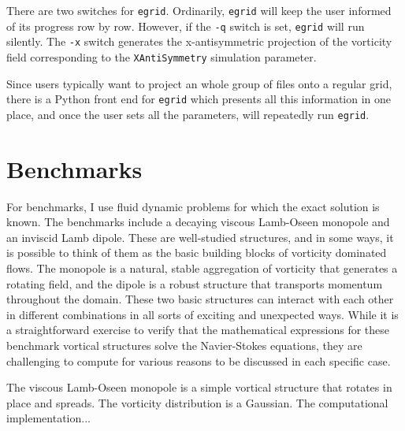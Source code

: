 \documentclass[12pt]{report}
\begin{document}
There are two switches for {\tt egrid}.  Ordinarily, {\tt egrid}
will keep the user informed of its progress row by row.  However, if the
{\tt -q} switch is set, {\tt egrid} will run silently.  The {\tt -x}
switch generates the x-antisymmetric projection of the vorticity field
corresponding to the {\tt XAntiSymmetry} simulation parameter.

Since users typically want to project an whole group of files onto a regular
grid, there is a Python front end for {\tt egrid} which
presents all this information in one place, and once the user sets all the
parameters, will repeatedly run {\tt egrid}.

% 

\section{Benchmarks}

For benchmarks, I use fluid dynamic problems for which the exact solution is
known.  The benchmarks include a decaying viscous Lamb-Oseen monopole and an
inviscid Lamb dipole.  These are well-studied structures, and in some ways, it
is possible to think of them as the basic building blocks of vorticity
dominated flows.  The monopole is a natural, stable aggregation of vorticity
that generates a rotating field, and the dipole is a robust structure that 
transports momentum throughout the domain.  These two basic structures can
interact with each other in different combinations in all sorts of exciting
and unexpected ways.  While it is a straightforward exercise to verify that the
mathematical expressions for these benchmark vortical structures solve
the Navier-Stokes equations, they are challenging to compute for various
reasons to be discussed in each specific case.

The viscous Lamb-Oseen monopole is a simple vortical structure that rotates in
place and spreads.  The vorticity distribution is a Gaussian.  The
computational implementation...
\end{document}
